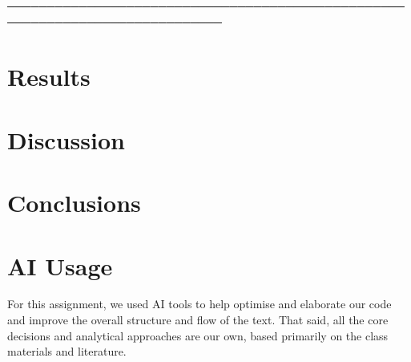 \documentclass[twocolumn, fontsize=10pt]{article}
\begin{document}
─────────────────────────────────────────────────────────────────────────────
\section{Results}
\label{sec:results}


\section{Discussion}
\label{sec:discussion}


\section{Conclusions}
\label{sec:conclusions}


\section*{AI Usage}
For this assignment, we used AI tools to help optimise and elaborate our code and improve the overall structure and flow of the text. That said, all the core decisions and analytical approaches are our own, based primarily on the class materials and literature.
\end{document}
